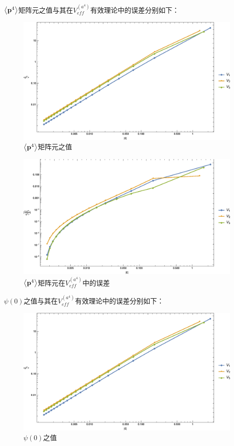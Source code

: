 \documentclass[hyperref,cs4size,titlepage,twoside]{ctexart}
\begin{document}
\clearpage
$\expval{\vb{p}^4}$矩阵元之值与其在$V_{eff}^{(a^4)}$有效理论中的误差分别如下：
\begin{figure}[!htbp]
  \centering
  \includegraphics[width=6in]{MultiplePotential_7.eps}
  \caption{$\expval{\vb{p}^4}$矩阵元之值}
\end{figure}
\begin{figure}[!htbp]
  \centering
  \includegraphics[width=6in]{MultiplePotential_8.eps}
  \caption{$\expval{\vb{p}^4}$矩阵元在$V_{eff}^{(a^4)}$中的误差}
\end{figure}
\clearpage
$\psi(0)$之值与其在$V_{eff}^{(a^4)}$有效理论中的误差分别如下：
\begin{figure}[!htbp]
  \centering
  \includegraphics[width=6in]{MultiplePotential_7.eps}
  \caption{$\psi(0)$之值}
\end{figure}
\end{document}
